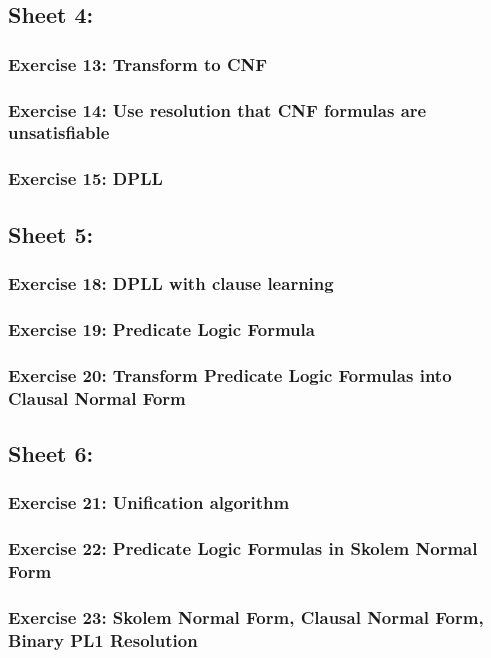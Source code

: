 \documentclass{article}
\begin{document}
    \subsection{Sheet 4:}
        \subsubsection{Exercise 13: Transform to CNF}
        \subsubsection{Exercise 14: Use resolution that CNF formulas are unsatisfiable}
        \subsubsection{Exercise 15: DPLL}
\newpage
    \subsection{Sheet 5:}
        \subsubsection{Exercise 18: DPLL with clause learning}
        \subsubsection{Exercise 19: Predicate Logic Formula}
        \subsubsection{Exercise 20: Transform Predicate Logic Formulas into Clausal Normal Form}
    \subsection{Sheet 6:}
        \subsubsection{Exercise 21: Unification algorithm}
        \subsubsection{Exercise 22: Predicate Logic Formulas in Skolem Normal Form}
        \subsubsection{Exercise 23: Skolem Normal Form, Clausal Normal Form, Binary PL1 Resolution}
\end{document}
